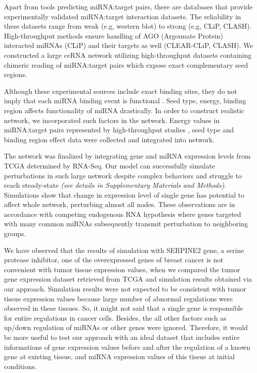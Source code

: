 \documentclass[a4,center,fleqn]{NAR}
\begin{document}
Apart from tools predicting miRNA:target pairs, there are databases that
provide experimentally validated miRNA:target interaction datasets. The
reliability in these datasets range from weak (e.g, western blot) to
strong (e.g, CLiP, CLASH). High-throughput methods ensure handling of
AGO (Argounate Protein) interacted miRNAs (CLiP) and their targets as
well (CLEAR-CLiP, CLASH). We constructed a large ceRNA network utilizing
high-throughput datasets containing chimeric reading of miRNA:target
pairs \citep{helwak_mapping_2013, moore_mirnatarget_2015} which expose
exact complementary seed regions.

Although these experimental sources include exact binding sites, they do
not imply that each miRNA binding event is functional
\citep{liu2019prediction}. Seed type, energy, binding region affects
functionality of miRNA drastically. In order to construct realistic
network, we incorporated such factors in the network. Energy values in
miRNA:target pairs represented by high-throughput studies
\citep{helwak_mapping_2013, moore_mirnatarget_2015}, seed type
\citep{grimson_microrna_2007, bartel_micrornas:_2009, betel2010comprehensive}
and binding region effect
\citep{hausser_analysis_2013, helwak_mapping_2013} data were collected
and integrated into network.

The network was finalized by integrating gene and miRNA expression
levels from TCGA determined by RNA-Seq. Our model can successfully
simulate perturbations in such large network despite complex behaviors
and struggle to reach steady-state \emph{(see details in Supplementary
Materials and Methods)}. Simulations show that change in expression
level of single gene has potential to affect whole network, perturbing
almost all nodes. These observations are in accordance with competing
endogenous RNA hypothesis where genes targeted with many common miRNAs
subsequently transmit perturbation to neighboring groups.

We have observed that the results of simulation with SERPINE2 gene, a
serine protease inhibitor, one of the overexpressed genes of breast
cancer \citep{yang2018expression, candia2006protease} is not convenient
with tumor tissue expression values, when we compared the tumor gene
expression dataset retrieved from TCGA and simulation results obtained
via our approach. Simulation results were not expected to be consistent
with tumor tissue expression values because large number of abnormal
regulations were observed in these tissues. So, it might not said that a
single gene is responsible for entire regulations in cancer cells.
Besides, the all other factors such as up/down regulation of miRNAs or
other genes were ignored. Therefore, it would be more useful to test our
approach with an ideal dataset that includes entire informations of gene
expression values before and after the regulation of a known gene at
existing tissue, and miRNA expression values of this tissue at initial
conditions.
\end{document}
